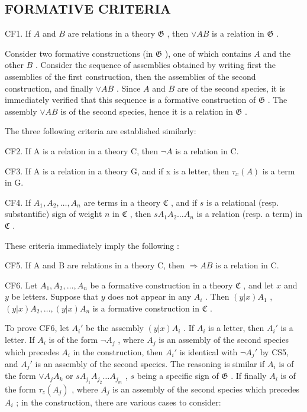 \subsection{FORMATIVE CRITERIA}

CF1. If \(A\) and \(B\) are relations in a theory \(\mathfrak{G}\) , then \(\vee AB\) is a relation in \(\mathfrak{G}\) .

Consider two formative constructions (in \(\mathfrak{G}\) ), one of which contains \(A\) and the other \(B\) . Consider the sequence of assemblies obtained by writing first the assemblies of the first construction, then the assemblies of the second construction, and finally \(\vee AB\) . Since \(A\) and \(B\) are of the second species, it is immediately verified that this sequence is a formative construction of \(\mathfrak{G}\) . The assembly \(\vee AB\) is of the second species, hence it is a relation in \(\mathfrak{G}\) .

The three following criteria are established similarly:

CF2. If A is a relation in a theory C, then \(\neg A\) is a relation in C.

CF3. If A is a relation in a theory G, and if x is a letter, then \(\tau_{x}(A)\) is a term in G.

CF4. If \(A_1, A_2, \ldots, A_n\) are terms in a theory \(\mathfrak{C}\) , and if \(s\) is a relational (resp. substantific) sign of weight \(n\) in \(\mathfrak{C}\) , then \(sA_1A_2\ldots A_n\) is a relation (resp. a term) in \(\mathfrak{C}\) .

These criteria immediately imply the following :

CF5. If A and B are relations in a theory C, then \(\Longrightarrow AB\) is a relation in C.

CF6. Let \(A_1, A_2, \ldots, A_n\) be a formative construction in a theory \(\mathfrak{C}\) , and let \(x\) and \(y\) be letters. Suppose that \(y\) does not appear in any \(A_i\) . Then \((y|x)A_1\) , \((y|x)A_2, \ldots, (y|x)A_n\) is a formative construction in \(\mathfrak{C}\) .

To prove CF6, let \(A_i'\) be the assembly \((y|x)A_i\) . If \(A_i\) is a letter, then \(A_i'\) is a letter. If \(A_i\) is of the form \(\neg A_j\) , where \(A_j\) is an assembly of the second species which precedes \(A_i\) in the construction, then \(A_i'\) is identical with \(\neg A_j'\) by CS5, and \(A_j'\) is an assembly of the second species. The reasoning is similar if \(A_i\) is of the form \(\vee A_jA_k\) or \(sA_{j_1}A_{j_2}\ldots A_{j_m}\) , \(s\) being a specific sign of \(\mathfrak{G}\) . If finally \(A_i\) is of the form \(\tau_z(A_j)\) , where \(A_j\) is an assembly of the second species which precedes \(A_i\) ; in the construction, there are various cases to consider:

